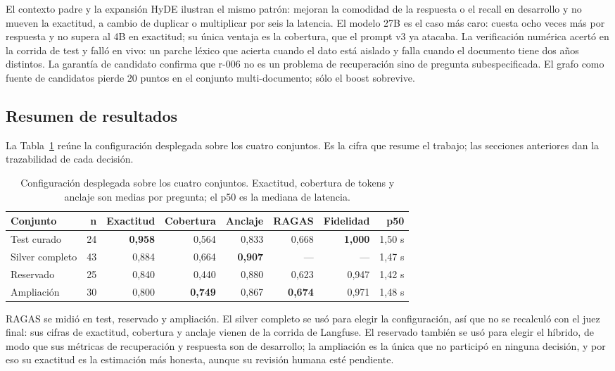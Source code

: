 El contexto padre y la expansi\'on HyDE ilustran el mismo patr\'on: mejoran la comodidad de la respuesta o el recall en desarrollo y no mueven la exactitud, a cambio de duplicar o multiplicar por seis la latencia. El modelo 27B es el caso m\'as caro: cuesta ocho veces m\'as por respuesta y no supera al 4B en exactitud; su \'unica ventaja es la cobertura, que el prompt v3 ya atacaba. La verificaci\'on num\'erica acert\'o en la corrida de test y fall\'o en vivo: un parche l\'exico que acierta cuando el dato est\'a aislado y falla cuando el documento tiene dos a\~nos distintos. La garant\'ia de candidato confirma que r-006 no es un problema de recuperaci\'on sino de pregunta subespecificada. El grafo como fuente de candidatos pierde 20 puntos en el conjunto multi-documento; s\'olo el boost sobrevive.

\subsection{Resumen de resultados}

La Tabla~\ref{tab:final} re\'une la configuraci\'on desplegada sobre los cuatro conjuntos. Es la cifra que resume el trabajo; las secciones anteriores dan la trazabilidad de cada decisi\'on.

\begin{table}[t]
\centering
\footnotesize
\caption{Configuraci\'on desplegada sobre los cuatro conjuntos. Exactitud, cobertura de tokens y anclaje son medias por pregunta; el p50 es la mediana de latencia.}
\label{tab:final}
\begin{tabular}{lrrrrrrr}
\toprule
Conjunto & n & Exactitud & Cobertura & Anclaje & RAGAS & Fidelidad & p50 \\
\midrule
Test curado & 24 & \textbf{0,958} & 0,564 & 0,833 & 0,668 & \textbf{1,000} & 1,50 s \\
Silver completo & 43 & 0,884 & 0,664 & \textbf{0,907} & --- & --- & 1,47 s \\
Reservado & 25 & 0,840 & 0,440 & 0,880 & 0,623 & 0,947 & 1,42 s \\
Ampliaci\'on & 30 & 0,800 & \textbf{0,749} & 0,867 & \textbf{0,674} & 0,971 & 1,48 s \\
\bottomrule
\end{tabular}
\end{table}

RAGAS se midi\'o en test, reservado y ampliaci\'on. El silver completo se us\'o para elegir la configuraci\'on, as\'i que no se recalcul\'o con el juez final: sus cifras de exactitud, cobertura y anclaje vienen de la corrida de Langfuse. El reservado tambi\'en se us\'o para elegir el h\'ibrido, de modo que sus m\'etricas de recuperaci\'on y respuesta son de desarrollo; la ampliaci\'on es la \'unica que no particip\'o en ninguna decisi\'on, y por eso su exactitud es la estimaci\'on m\'as honesta, aunque su revisi\'on humana est\'e pendiente.

